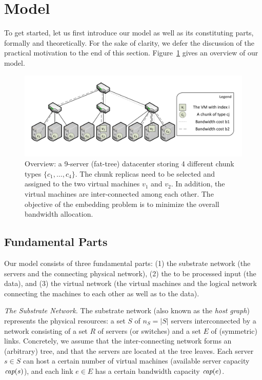 \documentclass[9pt,twocolumn]{scrartcl}
\newcommand{\capacity}{\emph{cap}}
\begin{document}
\section{Model}\label{sec:model}

To get started, let us first introduce our model as well as its constituting parts, formally and theoretically.
For the sake of clarity, we defer the discussion of the practical motivation 
to the end of this section. Figure~\ref{fig:overview} gives an overview of our model.

\begin{figure}[t]
\centering
\includegraphics[width=0.99\columnwidth]{figs/overview-fig.pdf}
\caption{Overview: a 9-server (fat-tree) datacenter storing 4 different chunk
types $\{c_1,\ldots,c_4\}$. The chunk replicas need to be selected and assigned to the two
 virtual machines $v_1$ and $v_2$. In addition, the virtual machines are inter-connected among
 each other. The objective of the embedding problem is to minimize the overall bandwidth allocation.}
\label{fig:overview}
\end{figure}



\subsection{Fundamental Parts}

Our model consists of three fundamental parts: (1) the substrate network (the servers
and the connecting physical network),
(2) the to be processed input (the data), and
(3) the virtual network (the virtual machines and the logical network connecting the machines to each other
as well as to the data).

\emph{The Substrate Network.} The substrate network (also known as the \emph{host graph}) represents the physical resources:
a set $S$ of $n_S=|S|$ servers interconnected by a network consisting of a set $R$ of servers (or switches)
and a set $E$ of (symmetric) links. Concretely, we assume that the inter-connecting network forms an (arbitrary) tree,
and that the servers are located at the tree leaves.
Each server $s\in S$ can host a certain number
of virtual machines (available server capacity $\capacity(s)$), and each link $e\in E$ has a certain bandwidth
capacity $\capacity(e)$.
\end{document}

